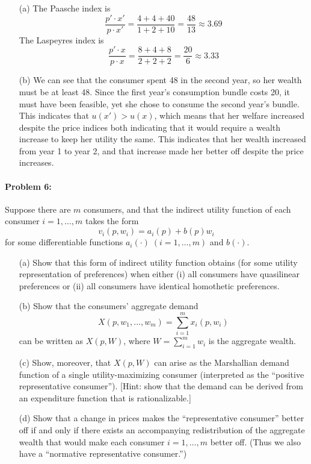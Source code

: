 \documentclass[12pt]{article}
\begin{document}
\begin{itemize}
    \item[(a)] The Paasche index is
    \[
    \frac{p' \cdot x'}{p \cdot x'} = \frac{4 + 4 + 40}{1 + 2 + 10} = \frac{48}{13} \approx 3.69
    \]
    The Laspeyres index is
    \[
    \frac{p' \cdot x}{p \cdot x} = \frac{8 + 4 + 8}{2 + 2 + 2} = \frac{20}{6}  \approx 3.33
    \]

    \item[(b)] We can see that the consumer spent 48 in the second year, so her wealth must be at least 48. Since the first year's consumption bundle costs 20, it must have been feasible, yet she chose to consume the second year's bundle. This indicates that $u(x') > u(x)$, which means that her welfare increased despite the price indices both indicating that it would require a wealth increase to keep her utility the same. This indicates that her wealth increased from year 1 to year 2, and that increase made her better off despite the price increases.
\end{itemize}

\paragraph{Problem 6:} Suppose there are $m$ consumers, and that the indirect utility function of each consumer $i = 1,\dots,m$ takes the form
\[
v_i(p,w_i) = a_i(p) + b(p)w_i
\]
for some differentiable functions $a_i(\cdot) \; (i = 1,\dots,m)$ and $b(\cdot)$.

\begin{itemize}
    \item[(a)] Show that this form of indirect utility function obtains (for some utility representation of preferences) when either (i) all consumers have quasilinear preferences or (ii) all consumers have identical homothetic preferences.

    \item[(b)] Show that the consumers' aggregate demand
    \[
    X(p,w_1,\dots,w_m) = \sum_{i=1}^m x_i(p,w_i)
    \]
    can be written as $X(p,W)$, where $W = \sum_{i=1}^m w_i$ is the aggregate wealth.

    \item[(c)] Show, moreover, that $X(p,W)$ can arise as the Marshallian demand function of a single utility-maximizing consumer (interpreted as the ``positive representative consumer''). [Hint: show that the demand can be derived from an expenditure function that is rationalizable.]

    \item[(d)] Show that a change in prices makes the ``representative consumer'' better off if and only if there exists an accompanying redistribution of the aggregate wealth that would make each consumer $i = 1,\dots,m$ better off. (Thus we also have a ``normative representative consumer.'')
\end{itemize}
\end{document}
